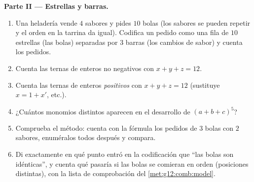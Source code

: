 \begin{problem}
\medskip
\noindent\textbf{Parte II --- Estrellas y barras.}
\begin{enumerate}[resume]
  \item Una heladería vende $4$ sabores y pides $10$ bolas (los sabores se
        pueden repetir y el orden en la tarrina da igual). Codifica un
        pedido como una fila de $10$ estrellas (las bolas) separadas por $3$
        barras (los cambios de sabor) y cuenta los pedidos.
  \item Cuenta las ternas de enteros no negativos con $x + y + z = 12$.
  \item Cuenta las ternas de enteros \emph{positivos} con $x + y + z = 12$
        (sustituye $x = 1 + x'$, etc.).
  \item ¿Cuántos monomios distintos aparecen en el desarrollo de
        $(a + b + c)^5$?
  \item Comprueba el método: cuenta con la fórmula los pedidos de $3$ bolas
        con $2$ sabores, enuméralos todos después y compara.
  \item Di exactamente en qué punto entró en la codificación que ``las bolas
        son idénticas'', y cuenta qué pasaría si las bolas se comieran en
        orden (posiciones distintas), con la lista de comprobación del
        \cref{met:g12:comb:model}.
\end{enumerate}


\end{problem}
